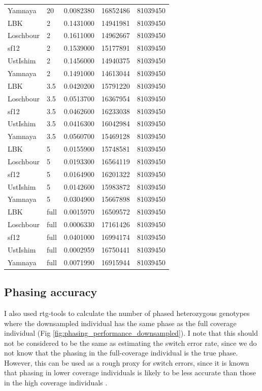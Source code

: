 {\begin{table}
\begin{tabular}[t]{llrrr}
Yamnaya & 20 & 0.0082380 & 16852486 & 81039450\\
LBK & 2 & 0.1431000 & 14941981 & 81039450\\
Loschbour & 2 & 0.1611000 & 14962667 & 81039450\\
sf12 & 2 & 0.1539000 & 15177891 & 81039450\\
UstIshim & 2 & 0.1456000 & 14940375 & 81039450\\
Yamnaya & 2 & 0.1491000 & 14613044 & 81039450\\
LBK & 3.5 & 0.0420200 & 15791220 & 81039450\\
Loschbour & 3.5 & 0.0513700 & 16367954 & 81039450\\
sf12 & 3.5 & 0.0462600 & 16233038 & 81039450\\
UstIshim & 3.5 & 0.0416300 & 16042984 & 81039450\\
Yamnaya & 3.5 & 0.0560700 & 15469128 & 81039450\\
LBK & 5 & 0.0155900 & 15748581 & 81039450\\
Loschbour & 5 & 0.0193300 & 16564119 & 81039450\\
sf12 & 5 & 0.0164900 & 16201322 & 81039450\\
UstIshim & 5 & 0.0142600 & 15983872 & 81039450\\
Yamnaya & 5 & 0.0304900 & 15667898 & 81039450\\
LBK & full & 0.0015970 & 16509572 & 81039450\\
Loschbour & full & 0.0006330 & 17161426 & 81039450\\
sf12 & full & 0.0401000 & 16994174 & 81039450\\
UstIshim & full & 0.0002959 & 16750441 & 81039450\\
Yamnaya & full & 0.0071990 & 16915944 & 81039450\\
\bottomrule
\end{tabular}
\endgroup{}
\end{table}




\subsection{Phasing accuracy}

I also used rtg-tools to calculate the number of phased heterozygous genotypes where the downsampled individual has the same phase as the full coverage individual (Fig \ref{fig:phasing_performance_downsampled}). I note that this should not be considered to be the same as estimating the switch error rate, since we do not know that the phasing in the full-coverage individual is the true phase. However, this can be used as a rough proxy for switch errors, since it is known that phasing in lower coverage individuals is likely to be less accurate than those in the high coverage individuals \cite{rubinacci2021efficient}.

}
